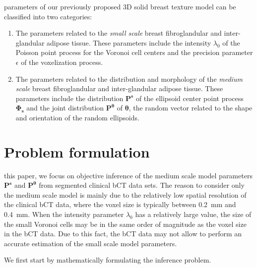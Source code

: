 \documentclass[journal]{IEEEtran}
\begin{document}
 parameters of our previously proposed 3D solid
breast texture model can be classified into two categories:

\begin{enumerate}

\item The parameters related to the \textit{small scale} breast
  fibroglandular and inter-glandular adipose tissue. These parameters
  include the intensity $\lambda_0$ of the Poisson point process for
  the Voronoi cell centers and the precision parameter $\epsilon$ of
  the voxelization process.

\item The parameters related to the distribution and morphology of the
  \textit{medium scale} breast fibroglandular and inter-glandular
  adipose tissue. These parameters include the distribution
  $\mathbf{P}^{\mathbf{s}}$ of the ellipsoid center point process
  $\mathbf{\Phi_s}$ and the joint distribution
  $\mathbf{P}^{\boldsymbol{\theta}}$ of $\boldsymbol{\theta}$, the
  random vector related to the shape and orientation of the random
  ellipsoids.

\end{enumerate}

\section{Problem formulation}
\label{sec:problem-statement}


 this paper, we focus on objective inference of the
medium scale model parameters $\mathbf{P}^{\mathbf{s}}$ and
$\mathbf{P}^{\boldsymbol{\theta}}$ from segmented clinical bCT data
sets. The reason to consider only the medium scale model is mainly due
to the relatively low spatial resolution of the clinical bCT data,
where the voxel size is typically between \SI{0.2}{\mm} and
\SI{0.4}{\mm}. When the intensity parameter $\lambda_0$ has a relatively
large value, the size of the small Voronoi cells may be in the same
order of magnitude as the voxel size in the bCT data. Due to this
fact, the bCT data may not allow to perform an accurate estimation of
the small scale model parameters.

We first start by mathematically formulating the inference problem.
\end{document}
